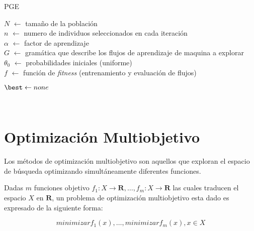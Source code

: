 \begin{algorithm}[htb!]
    \caption{PGE\label{algorithm:pge}}

    $N$ $\leftarrow$ tamaño de la población \\
    $n$ $\leftarrow$ numero de individuos seleccionados en cada iteración \\
    $\alpha$ $\leftarrow$ factor de aprendizaje \\
    $G$ $\leftarrow$ gramática que describe los flujos de aprendizaje de maquina a explorar \\
    $\theta_0$ $\leftarrow$ probabilidades iniciales (uniforme) \\
    $f$ $\leftarrow$ función de \emph{fitness} (entrenamiento y evaluación de flujos) \\


    $\best \leftarrow none$

    \Return{\best} \\
\end{algorithm}


\section{Optimización Multiobjetivo}\label{section:multiobjective}

Los métodos de optimización multiobjetivo son aquellos que exploran el espacio de búsqueda optimizando simultáneamente diferentes funciones.

\begin{definition}
\label{definition:multiobjective}

    Dadas $m$ funciones objetivo $f_1: X \rightarrow \mathbf{R}, \dots, f_m: X \rightarrow \mathbf{R}$ las cuales traducen el espacio $X$ en $\mathbf{R}$, un problema de optimización multiobjetivo esta dado es expresado de la siguiente forma:

    \begin{equation}
        minimizar f_1(x), \dots, minimizar f_m(x), x \in X
    \end{equation}
\end{definition}

